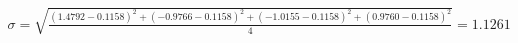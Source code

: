\documentclass[preview]{standalone}
\begin{document}
\begin{align*}
\sigma = \sqrt{\frac{(1.4792 - 0.1158)^2 + (-0.9766 - 0.1158)^2 + (-1.0155 - 0.1158)^2 + (0.9760 - 0.1158)^2}{4}} = 1.1261
\end{align*}
\end{document}

